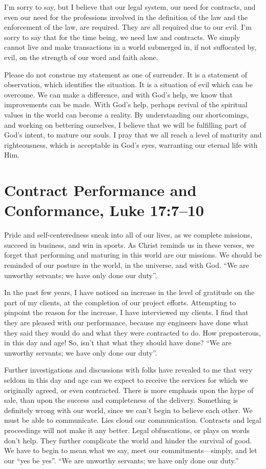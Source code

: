 \documentclass[12pt]{memoir}
\begin{document}
I'm sorry to say, but I believe that our legal system, our need for
contracts, and even our need for the professions involved in the definition
of the law and the enforcement of the law, are required. They are
all required due to our evil. I'm sorry to say that for the time being,
we need law and contracts. We simply cannot live and make transactions
in a world submerged in, if not suffocated by, evil, on the strength
of our word and faith alone.

Please do not construe my statement as one of surrender. It is a statement
of observation, which identifies the situation. It is a situation
of evil which can be overcome. We can make a difference, and with
God's help, we know that improvements can be made. With God's help,
perhaps revival of the spiritual values in the world can become a
reality. By understanding our shortcomings, and working on bettering
ourselves, I believe that we will be fulfilling part of God's intent,
to mature our souls. I pray that we all reach a level of maturity
and righteousness, which is acceptable in God's eyes, warranting our
eternal life with Him.

\section[Contract Performance and Conformance]{Contract Performance and Conformance, Luke 17:7--10}


Pride and self-centeredness sneak into all of our lives, as we complete
missions, succeed in business, and win in sports. As Christ reminds
us in these verses, we forget that performing and maturing in this
world are our missions. We should be reminded of our posture in the
world, in the universe, and with God. ``We are unworthy servants;
we have only done our duty''. 

In the past few years, I have noticed an increase in the level of
gratitude on the part of my clients, at the completion of our project
efforts. Attempting to pinpoint the reason for the increase, I have
interviewed my clients. I find that they are pleased with our performance,
because my engineers have done what they said they would do and what
they were contracted to do. How preposterous, in this day and age!
So, isn't that what they should have done? ``We are unworthy servants;
we have only done our duty''.

Further investigations and discussions with folks have revealed to
me that very seldom in this day and age can we expect to receive the
services for which we originally agreed, or even contracted. There
is more emphasis upon the hype of sale, than upon the success and
completeness of the delivery. Something is definitely wrong with our
world, since we can't begin to believe each other. We must be able
to communicate. Lies cloud our communication. Contracts and legal
proceedings will not make it any better. Legal obfuscations, or plays
on words don't help. They further complicate the world and hinder
the survival of good. We have to begin to mean what we say, meet our
commitments---simply, and let our ``yes be yes''. ``We are unworthy
servants; we have only done our duty.''
\end{document}
